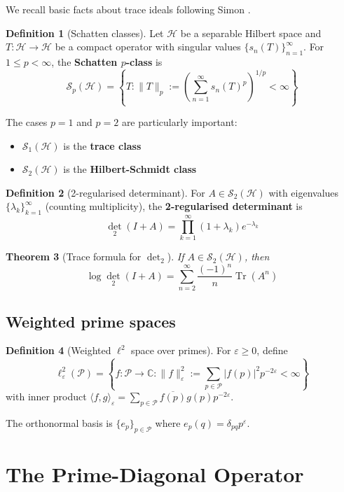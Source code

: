 \documentclass[11pt,a4paper]{article}
\newtheorem{theorem}{Theorem}[section]
\theoremstyle{definition}
\newtheorem{definition}[theorem]{Definition}
\theoremstyle{remark}
\newcommand{\C}{\mathbb{C}}
\newcommand{\calP}{\mathcal{P}}
\newcommand{\calS}{\mathcal{S}}
\newcommand{\calH}{\mathcal{H}}
\DeclareMathOperator{\Tr}{Tr}
\DeclareMathOperator{\det}{det}
\begin{document}
We recall basic facts about trace ideals following Simon \cite{SimonTrace2005}.

\begin{definition}[Schatten classes]
Let $\calH$ be a separable Hilbert space and $T: \calH \to \calH$ be a compact operator 
with singular values $\{s_n(T)\}_{n=1}^\infty$. For $1 \leq p < \infty$, the 
\textbf{Schatten $p$-class} is
\[
\calS_p(\calH) = \left\{ T : \|T\|_p := \left(\sum_{n=1}^\infty s_n(T)^p\right)^{1/p} < \infty \right\}
\]
\end{definition}

The cases $p = 1$ and $p = 2$ are particularly important:
\begin{itemize}
\item $\calS_1(\calH)$ is the \textbf{trace class}
\item $\calS_2(\calH)$ is the \textbf{Hilbert-Schmidt class}
\end{itemize}

\begin{definition}[2-regularised determinant]
For $A \in \calS_2(\calH)$ with eigenvalues $\{\lambda_k\}_{k=1}^\infty$ (counting 
multiplicity), the \textbf{2-regularised determinant} is
\[
\det_2(I + A) = \prod_{k=1}^\infty (1 + \lambda_k) e^{-\lambda_k}
\]
\end{definition}

\begin{theorem}[Trace formula for $\det_2$]
If $A \in \calS_2(\calH)$, then
\[
\log \det_2(I + A) = \sum_{n=2}^\infty \frac{(-1)^n}{n} \Tr(A^n)
\]
\end{theorem}

\subsection{Weighted prime spaces}

\begin{definition}[Weighted $\ell^2$ space over primes]
For $\varepsilon \geq 0$, define
\[
\ell^2_\varepsilon(\calP) = \left\{ f: \calP \to \C : \|f\|_\varepsilon^2 := \sum_{p \in \calP} |f(p)|^2 p^{-2\varepsilon} < \infty \right\}
\]
with inner product $\langle f, g \rangle_\varepsilon = \sum_{p \in \calP} \overline{f(p)} g(p) p^{-2\varepsilon}$.
\end{definition}

The orthonormal basis is $\{e_p\}_{p \in \calP}$ where $e_p(q) = \delta_{pq} p^\varepsilon$.

\section{The Prime-Diagonal Operator}\label{sec:operator}
\end{document}
